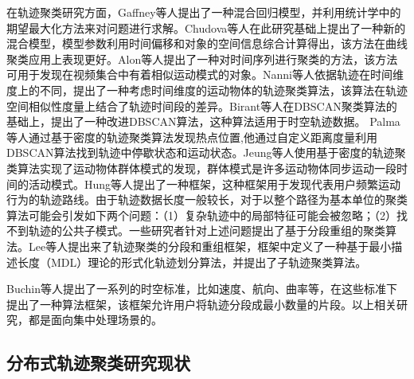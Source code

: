 在轨迹聚类研究方面，Gaffney等人提出了一种混合回归模型，并利用统计学中的期望最大化方法来对问题进行求解。Chudova等人在此研究基础上提出了一种新的混合模型，模型参数利用时间偏移和对象的空间信息综合计算得出，该方法在曲线聚类应用上表现更好。Alon等人提出了一种对时间序列进行聚类的方法，该方法可用于发现在视频集合中有着相似运动模式的对象。Nanni等人依据轨迹在时间维度上的不同，提出了一种考虑时间维度的运动物体的轨迹聚类算法，该算法在轨迹空间相似性度量上结合了轨迹时间段的差异。Birant等人在DBSCAN聚类算法的基础上，提出了一种改进DBSCAN算法，这种算法适用于时空轨迹数据。
Palma等人通过基于密度的轨迹聚类算法发现热点位置,他通过自定义距离度量利用DBSCAN算法找到轨迹中停歇状态和运动状态。Jeung等人使用基于密度的轨迹聚类算法实现了运动物体群体模式的发现，群体模式是许多运动物体同步运动一段时间的活动模式。Hung等人提出了一种框架，这种框架用于发现代表用户频繁运动行为的轨迹路线。由于轨迹数据长度一般较长，对于以整个路径为基本单位的聚类算法可能会引发如下两个问题：（1）复杂轨迹中的局部特征可能会被忽略；（2）找不到轨迹的公共子模式。一些研究者针对上述问题提出了基于分段重组的聚类算法。Lee等人提出来了轨迹聚类的分段和重组框架，框架中定义了一种基于最小描述长度（MDL）理论的形式化轨迹划分算法，并提出了子轨迹聚类算法。

Buchin等人提出了一系列的时空标准，比如速度、航向、曲率等，在这些标准下提出了一种算法框架，该框架允许用户将轨迹分段成最小数量的片段。以上相关研究，都是面向集中处理场景的。

\subsection{分布式轨迹聚类研究现状}

